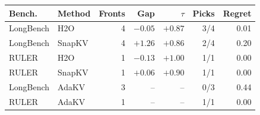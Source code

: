 \begin{tabular}{@{} l l r r r r r @{}}
  \toprule
  \textbf{Bench.} & \textbf{Method} & \textbf{Fronts} & \textbf{Gap} & \textbf{$\tau$} & \textbf{Picks} & \textbf{Regret} \\
  \midrule
  \rowcolor{gray!10}
  LongBench & H2O    & 4 & $-0.05$ & $+0.87$ & 3/4 & 0.01 \\
  LongBench & SnapKV & 4 & $+1.26$ & $+0.86$ & 2/4 & 0.20 \\
  \rowcolor{gray!10}
  RULER     & H2O    & 1 & $-0.13$ & $+1.00$ & 1/1 & 0.00 \\
  RULER     & SnapKV & 1 & $+0.06$ & $+0.90$ & 1/1 & 0.00 \\
  \midrule
  \rowcolor{gray!10}
  LongBench & AdaKV  & 3 & -- & -- & 0/3 & 0.44 \\
  RULER     & AdaKV  & 1 & -- & -- & 1/1 & 0.00 \\
  \bottomrule
\end{tabular}
